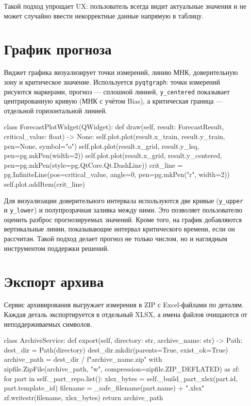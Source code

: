 \documentclass[12pt,a4paper]{article}
\begin{document}
Такой подход упрощает UX: пользователь всегда видит актуальные значения и
не может случайно ввести некорректные данные напрямую в таблицу.

\section*{График прогноза}
Виджет графика визуализирует точки измерений, линию МНК, доверительную зону
и критическое значение.
Используется \texttt{pyqtgraph}: точки измерений рисуются маркерами, прогноз ---
сплошной линией, \texttt{y\_centered} показывает центрированную кривую
(МНК с учётом Bias), а критическая граница --- отдельной горизонтальной линией.
\begin{codeblock}
class ForecastPlotWidget(QWidget):
    def draw(self, result: ForecastResult, critical_value: float) -> None:
        self.plot.plot(result.x_train, result.y_train, pen=None, symbol="o")
        self.plot.plot(result.x_grid, result.y_lsq, pen=pg.mkPen(width=2))
        self.plot.plot(result.x_grid, result.y_centered, pen=pg.mkPen(style=pg.QtCore.Qt.DashLine))
        crit_line = pg.InfiniteLine(pos=critical_value, angle=0, pen=pg.mkPen("r", width=2))
        self.plot.addItem(crit_line)
\end{codeblock}

Для визуализации доверительного интервала используются две кривые
(\texttt{y\_upper} и \texttt{y\_lower}) и полупрозрачная заливка между ними.
Это позволяет пользователю оценить разброс прогнозируемых значений. Кроме того,
на график добавляются вертикальные линии, показывающие интервал критического времени,
если он рассчитан. Такой подход делает прогноз не только числом, но и наглядным
инструментом поддержки решений.

\section*{Экспорт архива}
Сервис архивирования выгружает измерения в ZIP с Excel-файлами по деталям.
Каждая деталь экспортируется в отдельный XLSX, а имена файлов очищаются от
неподдерживаемых символов.
\begin{codeblock}
class ArchiveService:
    def export(self, directory: str, archive_name: str) -> Path:
        dest_dir = Path(directory)
        dest_dir.mkdir(parents=True, exist_ok=True)
        archive_path = dest_dir / f"{archive_name}.zip"
        with zipfile.ZipFile(archive_path, "w", compression=zipfile.ZIP_DEFLATED) as zf:
            for part in self._part_repo.list():
                xlsx_bytes = self._build_part_xlsx(part.id, part.template_id)
                filename = _safe_filename(part.name) + ".xlsx"
                zf.writestr(filename, xlsx_bytes)
        return archive_path
\end{codeblock}
\end{document}

